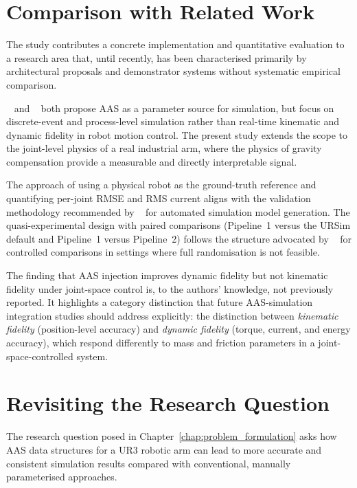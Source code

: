\section{Comparison with Related Work}
\label{sec:discussion_related}

The study contributes a concrete implementation and quantitative evaluation to a research area
that, until recently, has been characterised primarily by architectural proposals and
demonstrator systems without systematic empirical comparison.

\citeauthor{Bu2025}~\cite{Bu2025} and \citeauthor{Zhang2025}~\cite{Zhang2025} both propose AAS
as a parameter source for simulation, but focus on discrete-event and process-level simulation
rather than real-time kinematic and dynamic fidelity in robot motion control.
The present study extends the scope to the joint-level physics of a real industrial arm, where
the physics of gravity compensation provide a measurable and directly interpretable signal.

The approach of using a physical robot as the ground-truth reference and quantifying per-joint
RMSE and RMS current aligns with the validation methodology recommended by
\citeauthor{vuzem2025dt}~\cite{vuzem2025dt} for automated simulation model generation.
The quasi-experimental design with paired comparisons (Pipeline~1 versus the URSim default
and Pipeline~1 versus Pipeline~2) follows the structure advocated by
\citeauthor{cook1979quasi}~\cite{cook1979quasi} for controlled comparisons in settings where
full randomisation is not feasible.

The finding that AAS injection improves dynamic fidelity but not kinematic fidelity under
joint-space control is, to the authors' knowledge, not previously reported.
It highlights a category distinction that future AAS-simulation integration studies should
address explicitly: the distinction between \emph{kinematic fidelity} (position-level accuracy)
and \emph{dynamic fidelity} (torque, current, and energy accuracy), which respond differently to
mass and friction parameters in a joint-space-controlled system.


\section{Revisiting the Research Question}
\label{sec:discussion_rq}

The research question posed in Chapter~\ref{chap:problem_formulation} asks how AAS data
structures for a UR3 robotic arm can lead to more accurate and consistent simulation results
compared with conventional, manually parameterised approaches.

